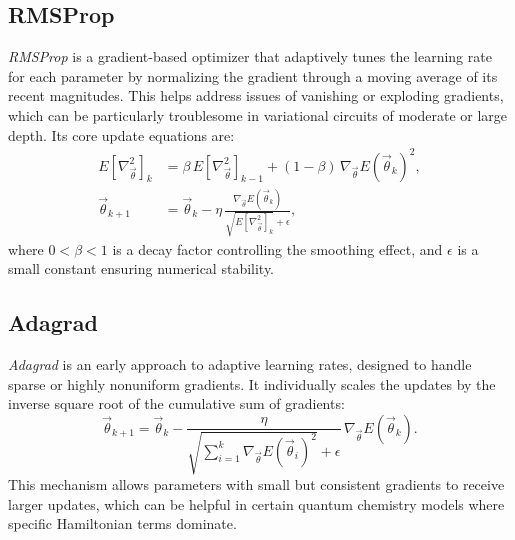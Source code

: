 \subsection{RMSProp}
\label{subsec:rmsprop}
\emph{RMSProp} is a gradient-based optimizer that adaptively tunes the learning rate for each parameter by normalizing the gradient through a moving average of its recent magnitudes. This helps address issues of vanishing or exploding gradients, which can be particularly troublesome in variational circuits of moderate or large depth. Its core update equations are:
\[
\begin{aligned}
E[\nabla^2_{\vec{\theta}}]_{k} &= \beta \, E[\nabla^2_{\vec{\theta}}]_{k-1}
+ (1-\beta)\,\nabla_{\vec{\theta}} E(\vec{\theta}_{k})^2,\\
\vec{\theta}_{k+1} &= \vec{\theta}_{k} 
- \eta \, \frac{\nabla_{\vec{\theta}} E(\vec{\theta}_{k})}
{\sqrt{E[\nabla^2_{\vec{\theta}}]_{k}} + \epsilon},
\end{aligned}
\]
where \(0 < \beta < 1\) is a decay factor controlling the smoothing effect, and \(\epsilon\) is a small constant ensuring numerical stability.

\subsection{Adagrad}
\label{subsec:adagrad}
\emph{Adagrad} is an early approach to adaptive learning rates, designed to handle sparse or highly nonuniform gradients. It individually scales the updates by the inverse square root of the cumulative sum of gradients:
\[
\vec{\theta}_{k+1} 
= \vec{\theta}_{k} 
- \frac{\eta}{\sqrt{\sum_{i=1}^{k} 
  \nabla_{\vec{\theta}} E(\vec{\theta}_{i})^2} + \epsilon}
  \,\nabla_{\vec{\theta}} E(\vec{\theta}_{k}).
\]
This mechanism allows parameters with small but consistent gradients to receive larger updates, which can be helpful in certain quantum chemistry models where specific Hamiltonian terms dominate.

